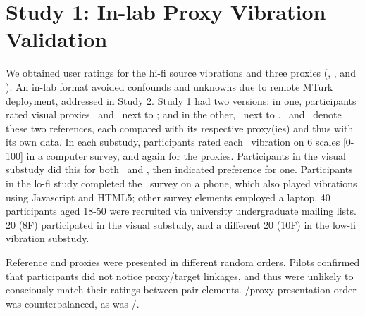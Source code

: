 

\hspace{0.2in}
\section{Study 1: In-lab Proxy Vibration Validation } 
%
We obtained user ratings for the hi-fi source vibrations \hifi and three proxies (\original, \linear, and \lofi). An in-lab format avoided confounds and unknowns due to remote MTurk deployment, addressed in Study 2.
Study 1 had two versions: in one, participants rated visual proxies \original\ and \linear~next to \hifi; and in the other, \lofi\ next to \hifi.
%
\visref\ and \lofiref\ denote these two references, each compared  with its respective proxy(ies) and thus with its own data. 
In each substudy, participants rated each \hifi\ vibration on 6 scales [0-100] in a computer survey, and again for the proxies.
Participants in the visual substudy did this for both \original~and \linear, then indicated preference for one.
Participants in the lo-fi  study completed the \lofi~survey on a phone, which also played vibrations using Javascript and HTML5; other survey elements  employed a laptop.
40 participants aged 18-50 were recruited via university undergraduate mailing lists.
20 (8F) participated in the visual substudy, and a different 20 (10F) in the low-fi vibration substudy.

Reference and proxies were presented in different random orders.
Pilots confirmed that  participants did not notice proxy/target linkages, and thus were unlikely to consciously match their ratings between pair elements. %
\hifi/proxy presentation order was counterbalanced, as was \original/\linear.




